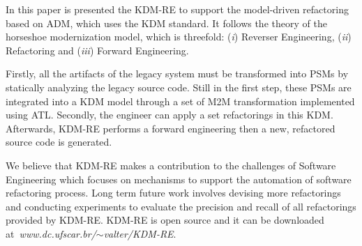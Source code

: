 In this paper is presented the KDM-RE to support the model-driven refactoring based on ADM, which uses the KDM standard. It follows the theory of the horseshoe modernization model, which is threefold: (\textit{i}) Reverser Engineering, (\textit{ii}) Refactoring and  (\textit{iii}) Forward Engineering. 

Firstly, all the artifacts of the legacy system must be transformed into PSMs by statically analyzing the legacy source code. Still in the first step, these PSMs are integrated into a KDM model through a set of M2M transformation implemented using ATL. Secondly, the engineer can apply a set refactorings in this KDM. Afterwards, KDM-RE performs a forward engineering then a new, refactored source code is generated.

We believe that KDM-RE makes a contribution to the challenges of Software Engineering which focuses on mechanisms to support the automation of software refactoring process. Long term future work involves devising more refactorings and conducting experiments to evaluate the precision and recall of all refactorings provided by KDM-RE. KDM-RE is open source and it can be downloaded at\textit{~www.dc.ufscar.br/$\sim$valter/KDM-RE}.
